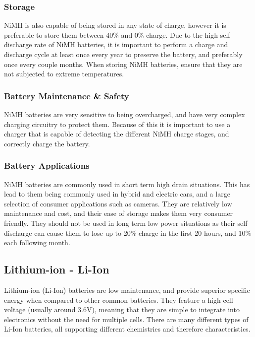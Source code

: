 \documentclass[a4paper,11pt]{article}
\begin{document}
\begin{multicols}{2}
\subsubsection{Storage}

NiMH is also capable of being stored in any state of charge, however it is preferable to store them between 40\% and 0\% charge. Due to the high self discharge rate of NiMH batteries, it is important to perform a charge and discharge cycle at least once every year to preserve the battery, and preferably once every couple months. When storing NiMH batteries, ensure that they are not subjected to extreme temperatures.  

\subsubsection{Battery Maintenance \& Safety}

NiMH batteries are very sensitive to being overcharged, and have very complex charging circuitry to protect them. Because of this it is important to use a charger that is capable of detecting the different NiMH charge stages, and correctly charge the battery.

\subsubsection{Battery Applications}

NiMH batteries are commonly used in short term high drain situations. This has lead to them being commonly used in hybrid and electric cars, and a large selection of consumer applications such as cameras. They are relatively low maintenance and cost, and their ease of storage makes them very consumer friendly. They should not be used in long term low power situations as their self discharge can cause them to lose up to 20\% charge in the first 20 hours, and 10\% each following month. 

\subsection{Lithium-ion - Li-Ion}

Lithium-ion (Li-Ion) batteries are low maintenance, and provide superior specific energy when compared to other common batteries. They feature a high cell voltage (usually around 3.6V), meaning that they are simple to integrate into electronics without the need for multiple cells. There are many different types of Li-Ion batteries, all supporting different chemistries and therefore characteristics.


\end{multicols}
\end{document}

